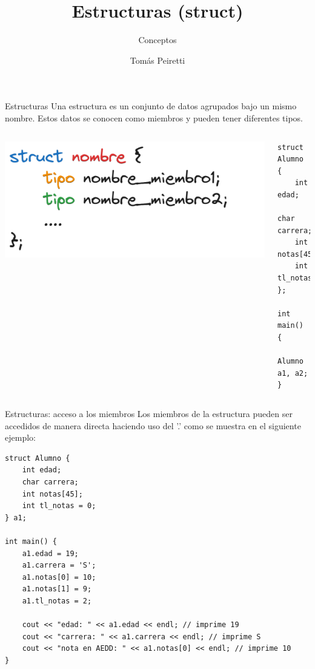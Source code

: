 \documentclass[12pt]{beamer}
\title{Estructuras (struct)}
\subtitle{Conceptos}
\author{Tomás Peiretti}
\date{}
\begin{document}
\maketitle

\begin{frame}[fragile]{Estructuras}
    Una estructura es un conjunto de datos agrupados bajo un mismo nombre. Estos datos se conocen como \alert{miembros} y pueden tener diferentes tipos.

    \medskip

    \begin{columns}
        \includegraphics[width=\textwidth]{sintaxis_struct.png}
        \begin{lstlisting}
struct Alumno {
    int edad;
    char carrera;
    int notas[45];
    int tl_notas;
};

int main() {
    Alumno a1, a2;
}
\end{lstlisting}
    \end{columns}
\end{frame}


\begin{frame}[fragile]{Estructuras: acceso a los miembros}
    Los miembros de la estructura pueden ser accedidos de manera directa haciendo uso del \alert{'.'} como se muestra en el siguiente ejemplo:

    \medskip
\begin{lstlisting}[basicstyle=\tiny]
struct Alumno {
    int edad;
    char carrera;
    int notas[45];
    int tl_notas = 0;
} a1;

int main() {
    a1.edad = 19;
    a1.carrera = 'S';
    a1.notas[0] = 10;
    a1.notas[1] = 9;
    a1.tl_notas = 2;
    
    cout << "edad: " << a1.edad << endl; // imprime 19
    cout << "carrera: " << a1.carrera << endl; // imprime S
    cout << "nota en AEDD: " << a1.notas[0] << endl; // imprime 10 
}
\end{lstlisting}
\end{frame}
\end{document}
